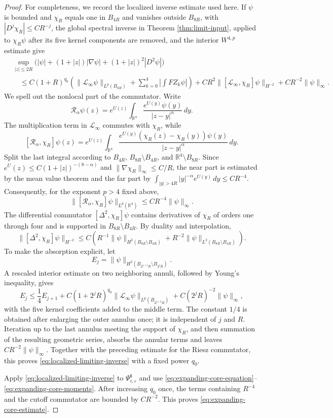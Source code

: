 \documentclass[11pt]{article}
\numberwithin{equation}{section}
\begin{document}
\begin{proof}
For completeness, we record the localized inverse estimate used here.
If $\psi$ is bounded and $\chi_R$ equals one in $B_{4R}$ and vanishes
outside $B_{8R}$, with $|D^j\chi_R|\leq CR^{-j}$, the global spectral
inverse in Theorem \ref{thm:limit-input}, applied to
$\chi_R\psi$ after its five kernel components are removed, and the
interior $W^{4,p}$ estimate give
\begin{equation}\label{eq:localized-limiting-inverse}
\begin{aligned}
&\sup_{|z|\leq2R}
\bigl(|\psi|+(1+|z|)|\nabla\psi|
+(1+|z|)^2|D^2\psi|\bigr)\\
&\quad\leq C(1+R)^{q_0}
\left(\|\mathcal L_\infty\psi\|_{L^p(B_{8R})}
+\sum_{k=0}^4\left|\int FZ_k\psi\right|\right)
+CR^2\|[\mathcal L_\infty,\chi_R]\psi\|_{H^{-2}}
+CR^{-2}\|\psi\|_\infty.
\end{aligned}
\end{equation}
We spell out the nonlocal part of the commutator.  Write
\[
\mathcal R_\alpha\psi(z)
=e^{U(z)}\int_{\mathbb R^4}
\frac{e^{U(y)}\psi(y)}{|z-y|^\alpha}\,dy.
\]
The multiplication term in $\mathcal L_\infty$ commutes with
$\chi_R$, while
\[
[\mathcal R_\alpha,\chi_R]\psi(z)
=e^{U(z)}\int_{\mathbb R^4}
\frac{e^{U(y)}(\chi_R(z)-\chi_R(y))\psi(y)}
{|z-y|^\alpha}\,dy.
\]
Split the last integral according to
$B_{4R}$, $B_{8R}\setminus B_{4R}$, and
$\mathbb R^4\setminus B_{8R}$.  Since
$e^U(z)\leq C(1+|z|)^{-(8-\alpha)}$ and
$\|\nabla\chi_R\|_\infty\leq C/R$, the near part is estimated by the
mean value theorem and the far part by
$\int_{|y|>4R}|y|^{-\alpha}e^{U(y)}\,dy\leq CR^{-4}$.
Consequently, for the exponent $p>4$ fixed above,
\[
\|[\mathcal R_\alpha,\chi_R]\psi\|_{L^p(\mathbb R^4)}
\leq CR^{-4}\|\psi\|_\infty.
\]
The differential commutator
$[\Delta^2,\chi_R]\psi$ contains derivatives of $\chi_R$ of orders
one through four and is supported in
$B_{8R}\setminus B_{4R}$.  By duality and interpolation,
\[
\|[\Delta^2,\chi_R]\psi\|_{H^{-2}}
\leq C\left(
R^{-1}\|\psi\|_{H^2(B_{8R}\setminus B_{4R})}
+R^{-2}\|\psi\|_{L^2(B_{8R}\setminus B_{4R})}\right).
\]
To make the absorption explicit, let
\[
E_j=\|\psi\|_{H^2(B_{2^{j+1}R}\setminus B_{2^jR})}.
\]
A rescaled interior estimate on two neighboring annuli, followed by
Young's inequality, gives
\[
E_j\leq \frac14E_{j+1}
+C(1+2^jR)^{q_0}
\|\mathcal L_\infty\psi\|_{L^p(B_{2^{j+2}R})}
+C(2^jR)^{-2}\|\psi\|_\infty,
\]
with the five kernel coefficients added to the middle term.  The
constant $1/4$ is obtained after enlarging the outer annulus once;
it is independent of $j$ and $R$.  Iteration up to the last annulus
meeting the support of $\chi_R$, and then summation of the resulting
geometric series, absorbs the annular terms and leaves
$CR^{-2}\|\psi\|_\infty$.  Together with the preceding estimate for
the Riesz commutator, this proves
\eqref{eq:localized-limiting-inverse} with a fixed power $q_0$.

Apply \eqref{eq:localized-limiting-inverse} to
$\Psi_{i,\varepsilon}^{\boldsymbol t}$ and use
\eqref{eq:expanding-core-equation}--
\eqref{eq:expanding-core-moments}. After increasing $q_0$ once, the
terms containing $R^{-4}$ and the cutoff commutator are bounded by
$CR^{-2}$. This proves \eqref{eq:expanding-core-estimate}.
\end{proof}
\end{document}
